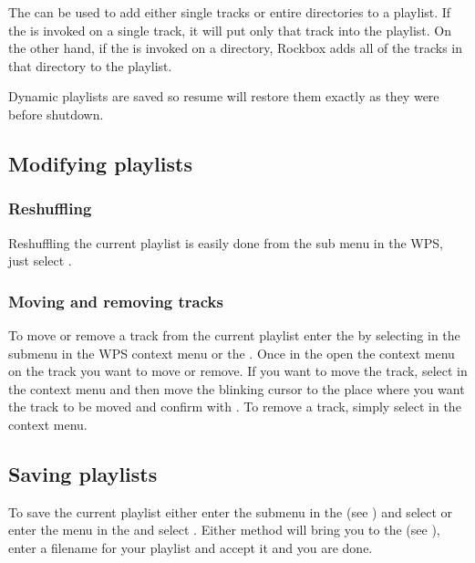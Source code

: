 The   can be used to add either single tracks or
entire directories to a playlist. If the  is
invoked on a single track, it will put only that track into the playlist.
On the other hand, if the  is invoked on a
directory, Rockbox adds all of the tracks in that directory to the
playlist.


Dynamic playlists are saved so resume will restore them exactly as they
were before shutdown.

  
\subsection{Modifying playlists}
\subsubsection{Reshuffling}
Reshuffling the current playlist is easily done from the 
sub menu in the WPS, just select .

\subsubsection{Moving and removing tracks}
To move or remove a track from the current playlist enter the
 by selecting  in the
 submenu in the WPS context menu or the .
Once in the  open the context menu on the track you
want to move or remove. If you want to move the track, select  in
the context menu and then move the blinking cursor to the place where you want
the track to be moved and confirm with \ActionStdOk. To remove a track, simply
select  in the context menu.

\subsection{Saving playlists}
To save the current playlist either enter the  submenu
in the  (see ) and
select  or enter the
 menu in the  and select
.
Either method will bring you to the  (see
), enter a filename for your playlist and
accept it and you are done.


